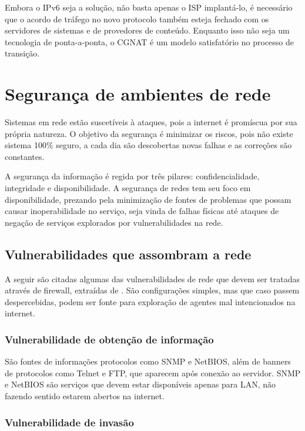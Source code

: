     Embora o IPv6 seja a solução, não basta apenas o ISP implantá-lo, é necessário que o acordo de tráfego no novo protocolo também esteja fechado com os servidores de sistemas e de provedores de conteúdo. Enquanto isso não seja um tecnologia de ponta-a-ponta, o CGNAT é um modelo satisfatório no processo de transição.

\section{Segurança de ambientes de rede}

    Sistemas em rede estão suscetíveis à ataques, pois a internet é promíscua por sua própria natureza. O objetivo da segurança é minimizar os riscos, pois não existe sistema 100\% seguro, a cada dia são descobertas novas falhas e as correções são constantes.
    
    A segurança da informação é regida por três pilares: confidencialidade, integridade e disponibilidade. A segurança de redes tem seu foco em disponibilidade, prezando pela minimização de fontes de problemas que possam causar inoperabilidade no serviço, seja vinda de falhas físicas até ataques de negação de serviços explorados por vulnerabilidades na rede.

\subsection{Vulnerabilidades que assombram a rede}

    A seguir são citadas algumas das vulnerabilidades de rede que devem ser tratadas através de firewall, extraídas de \cite{nakamura2007}. São configurações simples, mas que caso passem despercebidas, podem ser fonte para exploração de agentes mal intencionados na internet.
    
\subsubsection{Vulnerabilidade de obtenção de informação}
    
    São fontes de informações protocolos como SNMP e NetBIOS, além de banners de protocolos como Telnet e FTP, que aparecem após conexão ao servidor. SNMP e NetBIOS são serviços que devem estar disponíveis apenas para LAN, não fazendo sentido estarem abertos na internet.

\subsubsection{Vulnerabilidade de invasão}

